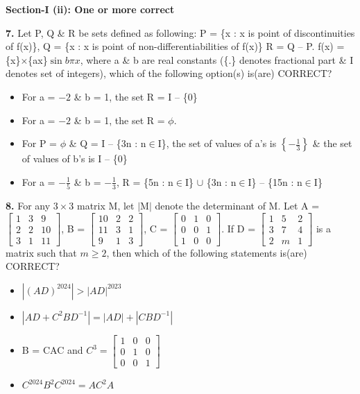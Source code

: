 \documentclass[10pt,twocolumn]{extarticle}
\newenvironment{qoptions}{\begin{itemize}[leftmargin=1.8em,itemsep=2pt,topsep=2pt,label={}]}{\end{itemize}}
\newcommand{\opt}[2]{\item[({#1})] {#2}}
\newcommand{\subsectionhdr}[1]{\par\vspace{3pt}\noindent\textbf{#1}\par\vspace{2pt}}
\begin{document}
\subsectionhdr{Section-I (ii): One or more correct}

\textbf{7.} Let P, Q \& R be sets defined as following:
P = \{x : x is point of discontinuities of f(x)\},
Q = \{x : x is point of non-differentiabilities of f(x)\}
R = Q -- P.
f(x) = \{x\}$\times$\{ax\}$\sin b\pi x$, where a \& b are real constants (\{.\} denotes fractional part \& I denotes set of integers), which of the following option(s) is(are) CORRECT?

\begin{qoptions}
\opt{A}{For a = $-2$ \& b = 1, the set R = I -- \{0\}}
\opt{B}{For a = $-2$ \& b = 1, the set R = $\phi$.}
\opt{C}{For P = $\phi$ \& Q = I -- \{3n : n$\in$I\}, the set of values of a's is $\left\{-\tfrac13\right\}$ \& the set of values of b's is I -- \{0\}}
\opt{D}{For a = $-\tfrac15$ \& b = $-\tfrac13$, R = \{5n : n$\in$I\} $\cup$ \{3n : n$\in$I\} -- \{15n : n$\in$I\}}
\end{qoptions}

\textbf{8.} For any $3\times3$ matrix M, let $|$M$|$ denote the determinant of M. Let A = $\begin{bmatrix}1&3&9\\2&2&10\\3&1&11\end{bmatrix}$, B = $\begin{bmatrix}10&2&2\\11&3&1\\9&1&3\end{bmatrix}$, C = $\begin{bmatrix}0&1&0\\0&0&1\\1&0&0\end{bmatrix}$. If D = $\begin{bmatrix}1&5&2\\3&7&4\\2&m&1\end{bmatrix}$ is a matrix such that $m\geqslant2$, then which of the following statements is(are) CORRECT?

\begin{qoptions}
\opt{A}{$|(AD)^{2024}| > |AD|^{2023}$}
\opt{B}{$|AD+C^2BD^{-1}| = |AD| + |CBD^{-1}|$}
\opt{C}{B = CAC and $C^3 = \begin{bmatrix}1&0&0\\0&1&0\\0&0&1\end{bmatrix}$}
\opt{D}{$C^{2024}B^2C^{2024} = AC^2A$}
\end{qoptions}
\end{document}
